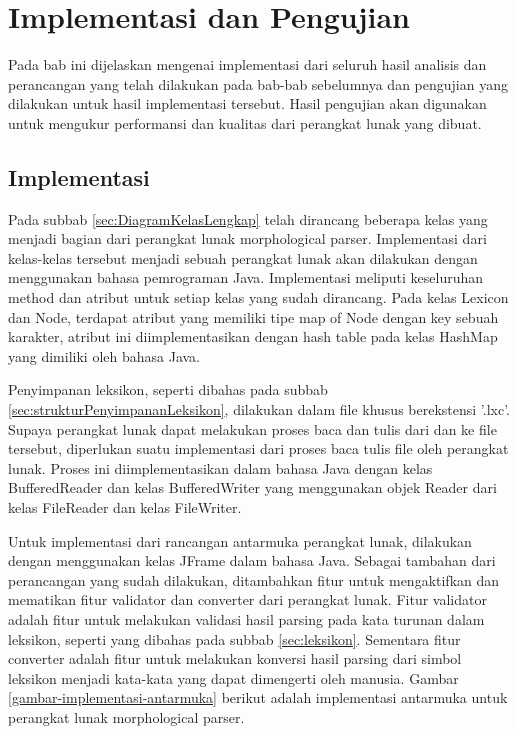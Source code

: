\chapter{Implementasi dan Pengujian}
\label{chap:implementasiDanPengujian}

Pada bab ini dijelaskan mengenai implementasi dari seluruh hasil analisis dan perancangan yang telah dilakukan pada bab-bab sebelumnya dan pengujian yang dilakukan untuk hasil implementasi tersebut. Hasil pengujian akan digunakan untuk mengukur performansi dan kualitas dari perangkat lunak yang dibuat.

\section{Implementasi}
\label{sec:implementasi}

Pada subbab \ref{sec:DiagramKelasLengkap} telah dirancang beberapa kelas yang menjadi bagian dari perangkat lunak morphological parser. Implementasi dari kelas-kelas tersebut menjadi sebuah perangkat lunak akan dilakukan dengan menggunakan bahasa pemrograman Java. Implementasi meliputi keseluruhan method dan atribut untuk setiap kelas yang sudah dirancang. Pada kelas Lexicon dan Node, terdapat atribut yang memiliki tipe map of Node dengan key sebuah karakter, atribut ini diimplementasikan dengan hash table pada kelas HashMap yang dimiliki oleh bahasa Java.

Penyimpanan leksikon, seperti dibahas pada subbab \ref{sec:strukturPenyimpananLeksikon}, dilakukan dalam file khusus berekstensi '.lxc'. Supaya perangkat lunak dapat melakukan proses baca dan tulis dari dan ke file tersebut, diperlukan suatu implementasi dari proses baca tulis file oleh perangkat lunak. Proses ini diimplementasikan dalam bahasa Java dengan kelas BufferedReader dan kelas BufferedWriter yang menggunakan objek Reader dari kelas FileReader dan kelas FileWriter.

Untuk implementasi dari rancangan antarmuka perangkat lunak, dilakukan dengan menggunakan kelas JFrame dalam bahasa Java. Sebagai tambahan dari perancangan yang sudah dilakukan, ditambahkan fitur untuk mengaktifkan dan mematikan fitur validator dan converter dari perangkat lunak. Fitur validator adalah fitur untuk melakukan validasi hasil parsing pada kata turunan dalam leksikon, seperti yang dibahas pada subbab \ref{sec:leksikon}. Sementara fitur converter adalah fitur untuk melakukan konversi hasil parsing dari simbol leksikon menjadi kata-kata yang dapat dimengerti oleh manusia. Gambar \ref{gambar-implementasi-antarmuka} berikut adalah implementasi antarmuka untuk perangkat lunak morphological parser.

